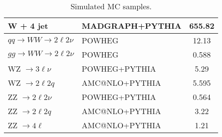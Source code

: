 \begin{table}
\begin{tabular}{l l c}
        W + 4 jet                                         & MADGRAPH+PYTHIA  & 655.82                         \\
        \hline
        $qq\rightarrow WW \rightarrow 2\ell 2\nu$         & POWHEG           & 12.13                          \\
        $gg\rightarrow WW \rightarrow 2\ell 2\nu$         & POWHEG           & 0.588                          \\
        WZ $\rightarrow 3\ell \nu$                        & POWHEG+PYTHIA    & 5.29                           \\
        WZ $\rightarrow 2\ell 2q$                         & AMC@NLO+PYTHIA   & 5.595                          \\
        ZZ $\rightarrow 2\ell 2\nu$                       & POWHEG+PYTHIA    & 0.564                          \\
        ZZ $\rightarrow 2\ell 2q$                         & AMC@NLO+PYTHIA   & 3.22                           \\
        ZZ $\rightarrow 4\ell$                            & AMC@NLO+PYTHIA   & 1.21                           \\
    \end{tabular}

    \caption{Simulated MC samples.} \label{tab:dat:mc2016}
\end{table}
